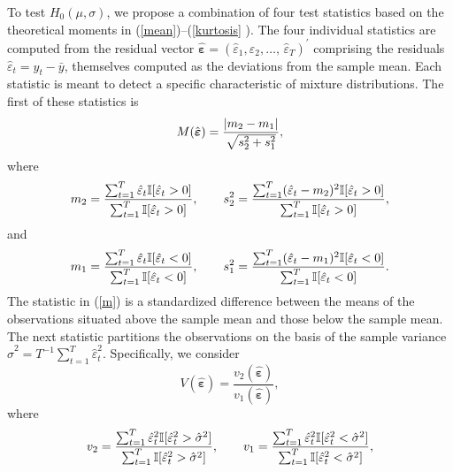 \documentclass[11pt]{article}
\begin{document}
To test $H_{0}(\mu ,\sigma )$, we propose a combination of four test
statistics based on the theoretical moments in (\ref{mean})--(\ref{kurtosis}%
). The four individual statistics are computed from the residual vector $%
\hat{\boldsymbol{\varepsilon }}=(\hat{\varepsilon}_{1},\hat{\varepsilon}%
_{2},\ldots ,\,\hat{\varepsilon}_{T})^{\prime }$ comprising the residuals $%
\hat{\varepsilon}_{t}=y_{t}-\bar{y}$, themselves computed as the deviations
from the sample mean. Each statistic is meant to detect a specific
characteristic of mixture distributions. The first of these statistics is 
\begin{equation}
M(\hat{\boldsymbol{\varepsilon }})=\frac{|m_{2}-m_{1}|}{\sqrt{%
s_{2}^{2}+s_{1}^{2}}},  \label{m}
\end{equation}%
where 
\begin{equation*}
m_{2}=\frac{\sum_{t=1}^{T}\hat{\varepsilon}_{t}\mathbb{I}[\hat{\varepsilon}%
_{t}>0]}{\sum_{t=1}^{T}\mathbb{I}[\hat{\varepsilon}_{t}>0]},\qquad s_{2}^{2}=%
\frac{\sum_{t=1}^{T}(\hat{\varepsilon}_{t}-m_{2})^{2}\mathbb{I}[\hat{%
\varepsilon}_{t}>0]}{\sum_{t=1}^{T}\mathbb{I}[\hat{\varepsilon}_{t}>0]},
\end{equation*}%
and 
\begin{equation*}
m_{1}=\frac{\sum_{t=1}^{T}\hat{\varepsilon}_{t}\mathbb{I}[\hat{\varepsilon}%
_{t}<0]}{\sum_{t=1}^{T}\mathbb{I}[\hat{\varepsilon}_{t}<0]},\qquad s_{1}^{2}=%
\frac{\sum_{t=1}^{T}(\hat{\varepsilon}_{t}-m_{1})^{2}\mathbb{I}[\hat{%
\varepsilon}_{t}<0]}{\sum_{t=1}^{T}\mathbb{I}[\hat{\varepsilon}_{t}<0]}.
\end{equation*}%
The statistic in (\ref{m}) is a standardized difference between the means of
the observations situated above the sample mean and those below the sample
mean. The next statistic partitions the observations on the basis of the
sample variance $\hat{\sigma}^{2}=T^{-1}\sum_{t=1}^{T}\hat{\varepsilon}%
_{t}^{2}.$ Specifically, we consider 
\begin{equation}
V(\hat{\boldsymbol{\varepsilon }})=\frac{v_{2}(\hat{\boldsymbol{\varepsilon }%
})}{v_{1}(\hat{\boldsymbol{\varepsilon }})},  \label{v}
\end{equation}%
where 
\begin{equation*}
v_{2}=\frac{\sum_{t=1}^{T}\hat{\varepsilon}_{t}^{2}\mathbb{I}[\hat{%
\varepsilon}_{t}^{2}>\hat{\sigma}^{2}]}{\sum_{t=1}^{T}\mathbb{I}[\hat{%
\varepsilon}_{t}^{2}>\hat{\sigma}^{2}]},\qquad v_{1}=\frac{\sum_{t=1}^{T}%
\hat{\varepsilon}_{t}^{2}\mathbb{I}[\hat{\varepsilon}_{t}^{2}<\hat{\sigma}%
^{2}]}{\sum_{t=1}^{T}\mathbb{I}[\hat{\varepsilon}_{t}^{2}<\hat{\sigma}^{2}]},
\end{equation*}%
\end{document}
